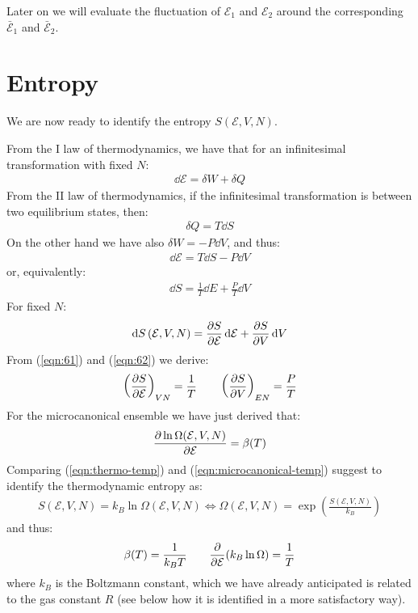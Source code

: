 \documentclass[../template.tex]{subfiles}
\begin{document}
Later on we will evaluate the fluctuation of $\mathcal{E}_1$ and $\mathcal{E}_2$ around the corresponding $\bar{\mathcal{E}}_1$ and $\bar{\mathcal{E}}_2$.

\section{Entropy}

We are now ready to identify the entropy $S(\mathcal{E}, V, N)$.

\medskip

From the I law of thermodynamics, we have that for an infinitesimal transformation with fixed $N$:
\begin{align*}
    \dd{\mathcal{E}} = \delta W + \delta Q
\end{align*}
From the II law of thermodynamics, if the infinitesimal transformation is between two equilibrium states, then:
\begin{align*}
    \delta Q = T \dd{S}
\end{align*}
On the other hand we have also $\delta W = - P \dd{V}$, and thus:
\begin{align}\label{eqn:first-law}
    \dd{\mathcal{E}} = T \dd{S} - P \dd{V}
\end{align}
or, equivalently:
\begin{align}\label{eqn:61}
    \dd{S} = \frac{1}{T} \dd{E} + \frac{P}{T} \dd{V}  
\end{align}
For fixed $N$:
\begin{align}\label{eqn:62}
    \dd{S}(\mathcal{E}, V, N) = \pdv{S}{\mathcal{E}} \dd{\mathcal{E}} + \pdv{S}{V} \dd{V}
\end{align}
From (\ref{eqn:61}) and (\ref{eqn:62}) we derive:
\begin{align}\label{eqn:thermo-temp}
    \left(\pdv{S}{\mathcal{E}}\right)_{VN} = \frac{1}{T} \qquad \left(\pdv{S}{V}\right)_{EN} = \frac{P}{T} 
\end{align}
For the microcanonical ensemble we have just derived that:
\begin{align}\label{eqn:microcanonical-temp}
    \pdv{\ln \Omega (\mathcal{E}, V, N)}{\mathcal{E}} = \beta(T)
\end{align}
Comparing (\ref{eqn:thermo-temp}) and (\ref{eqn:microcanonical-temp}) suggest to identify the thermodynamic entropy as:
\begin{align}\label{eqn:entropy}
    S(\mathcal{E}, V, N) = k_B \ln \Omega(\mathcal{E}, V, N) \Leftrightarrow \Omega(\mathcal{E}, V, N) = \exp\left(\frac{S(\mathcal{E}, V, N)}{k_B} \right)
\end{align}
and thus:
\begin{align}\label{eqn:beta-t}
    \beta(T) = \frac{1}{k_B T} \qquad \pdv{\mathcal{E}}(k_B \ln \Omega) = \frac{1}{T}  
\end{align}
where $k_B$ is the Boltzmann constant, which we have already anticipated is related to the gas constant $R$ (see below how it is identified in a more satisfactory way).
\end{document}
